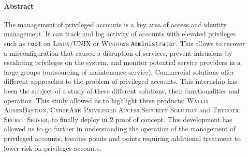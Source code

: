 
\paragraph{Abstract}
The management of privileged accounts is a key area of access and identity management. It can track and log activity of accounts with elevated privileges such as \texttt{root} on \textsc{Linux/UNIX} or \textsc{Windows} \texttt{Administrator}. This allows to recover a misconfiguration that caused a disruption of services, prevent intrusions by escalating privileges on the system, and monitor potential service providers in a large groups (outsourcing of maintenance service). Commercial solutions offer different approaches to the problem of privileged accounts. This internship has been the subject of a study of these different solutions, their functionalities and operation. This study allowed us to highlight three products: \textsc{Wallix AdminBastion}, \textsc{CyberArk Privileged Access Security Solution} and \textsc{Thycotic Secret Server}, to finally deploy in 2 proof of concept. This development has allowed us to go further in understanding the operation of the management of privileged accounts, treaties points and points requiring additional treatment to lower risk on privileges accounts.

\subsubsection*{}

